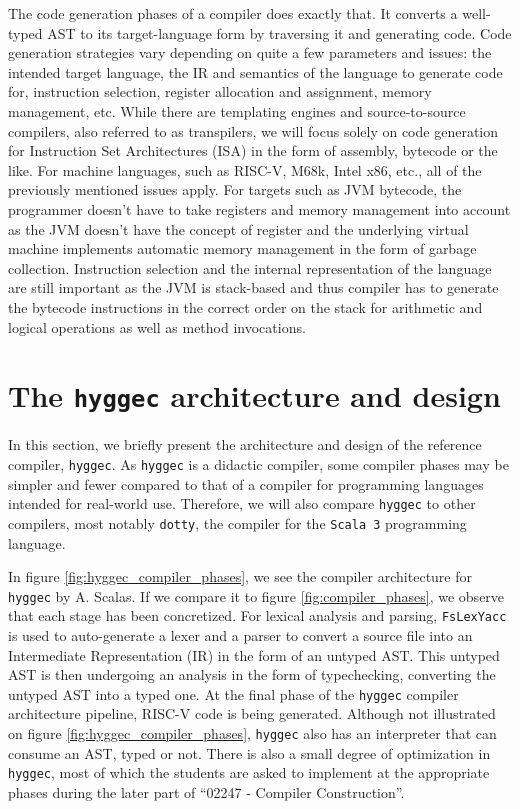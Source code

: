 The code generation phases of a compiler does exactly that. It converts a well-typed AST to its target-language form by traversing it and generating code.
Code generation strategies vary depending on quite a few parameters and issues: the intended target language, the IR and semantics of the language to generate code for,
instruction selection, register allocation and assignment, memory management, etc. While there are templating engines and source-to-source compilers,
also referred to as transpilers, we will focus solely on code generation for Instruction Set Architectures (ISA) in the form of assembly, bytecode or the like.
For machine languages, such as RISC-V, M68k, Intel x86, etc., all of the previously mentioned issues apply. For targets such as JVM bytecode, the programmer
doesn't have to take registers and memory management into account as the JVM doesn't have the concept of register and the underlying virtual machine
implements automatic memory management in the form of garbage collection. Instruction selection and the internal representation of the language are still
important as the JVM is stack-based and thus compiler has to generate the bytecode instructions in the correct order on the stack for arithmetic and
logical operations as well as method invocations.

\section{The \texttt{hyggec} architecture and design}

In this section, we briefly present the architecture and design of the reference compiler, \texttt{hyggec}. As \texttt{hyggec} is a didactic compiler,
some compiler phases may be simpler and fewer compared to that of a compiler for programming languages intended for real-world use.
Therefore, we will also compare \texttt{hyggec} to other compilers, most notably \texttt{dotty}, the compiler
for the \texttt{Scala 3} programming language.

In figure \ref{fig:hyggec_compiler_phases}, we see the compiler architecture for \texttt{hyggec} by A. Scalas. If we compare it
to figure \ref{fig:compiler_phases}, we observe that each stage has been concretized. For lexical analysis and parsing, \texttt{FsLexYacc}
is used to auto-generate a lexer and a parser to convert a source file into an Intermediate Representation (IR) in the form of an untyped 
AST. This untyped AST is then undergoing an analysis in the form of typechecking, converting the untyped AST into a typed one. At the
final phase of the \texttt{hyggec} compiler architecture pipeline, RISC-V code is being generated. Although not illustrated on figure
\ref{fig:hyggec_compiler_phases}, \texttt{hyggec} also has an interpreter that can consume an AST, typed or not.
There is also a small degree of optimization in \texttt{hyggec}, most of which the students are asked to implement at the appropriate
phases during the later part of ``02247 - Compiler Construction''.

